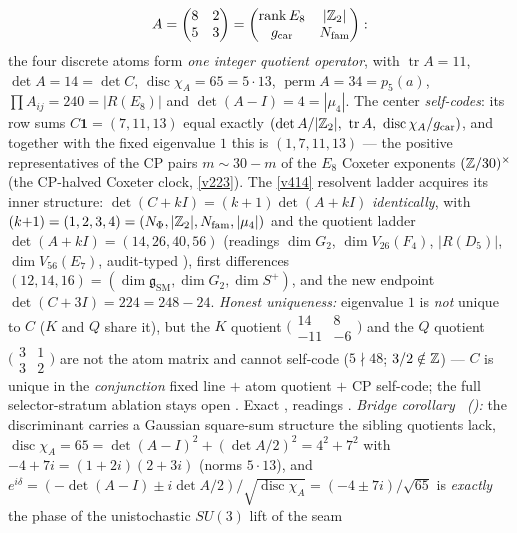\begin{keybox}
\[
  A=\begin{pmatrix}8&2\\5&3\end{pmatrix}
   =\begin{pmatrix}\operatorname{rank}E_8&|\mathbb{Z}_2|\\ g_{\mathrm{car}}&N_{\mathrm{fam}}\end{pmatrix}:
\]
the four discrete atoms form \emph{one integer quotient operator}, with
$\operatorname{tr}A=11$, $\det A=14=\det C$, $\operatorname{disc}\chi_A=65=5\cdot13$,
$\operatorname{perm}A=34=p_5(a)$, $\prod A_{ij}=240=|R(E_8)|$ and $\det(A{-}I)=4=|\mu_4|$. The center
\emph{self-codes}: its row sums $C\mathbf 1=(7,11,13)$ equal exactly
$(\det A/|\Z_2|,\ \operatorname{tr}A,\ \operatorname{disc}\chi_A/\gcar)$, and together with the fixed
eigenvalue $1$ this is $(1,7,11,13)$ --- the positive representatives of the CP pairs $m\sim30{-}m$ of the
$E_8$ Coxeter exponents $(\mathbb{Z}/30)^\times$ (the CP-halved Coxeter clock, \vref{v223}). The \vref{v414}
resolvent ladder acquires its inner structure: $\det(C{+}kI)=(k{+}1)\det(A{+}kI)$ \emph{identically}, with
$(k{+}1)=(1,2,3,4)=(N_\Phi,|\mathbb{Z}_2|,N_{\mathrm{fam}},|\mu_4|)$ and the quotient ladder
$\det(A{+}kI)=(14,26,40,56)$ (readings $\dim G_2$, $\dim V_{26}(F_4)$, $|R(D_5)|$, $\dim V_{56}(E_7)$,
audit-typed \mC), first differences $(12,14,16)=(\dim\mathfrak g_{\mathrm{SM}},\dim G_2,\dim S^+)$, and the
new endpoint $\det(C{+}3I)=224=248-24$. \emph{Honest uniqueness:} eigenvalue $1$ is \emph{not} unique to
$C$ ($K$ and $Q$ share it), but the $K$ quotient
$\big(\begin{smallmatrix}14&8\\-11&-6\end{smallmatrix}\big)$ and the $Q$ quotient
$\big(\begin{smallmatrix}3&1\\3&2\end{smallmatrix}\big)$ are not the atom matrix and cannot self-code
($5\nmid48$; $3/2\notin\mathbb{Z}$) --- $C$ is unique in the \emph{conjunction} fixed line $+$ atom quotient $+$
CP self-code; the full selector-stratum ablation stays open \mO. Exact \mE, readings \mC.
\emph{Bridge corollary \mE\ ():} the discriminant carries a
Gaussian square-sum structure the sibling quotients lack,
$\operatorname{disc}\chi_A=65=\det(A{-}I)^2+(\det A/2)^2=4^2+7^2$ with $-4+7i=(1{+}2i)(2{+}3i)$
(norms $5\cdot13$), and $e^{i\delta}=(-\det(A{-}I)\pm i\det A/2)/\sqrt{\operatorname{disc}\chi_A}
=(-4\pm7i)/\sqrt{65}$ is \emph{exactly} the phase of the unistochastic $SU(3)$ lift of the seam

\end{keybox}
